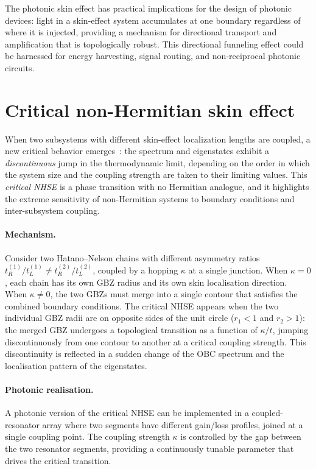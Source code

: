\begin{remark}
The photonic skin effect has practical implications for the design of
photonic devices: light in a skin-effect
system accumulates at one boundary regardless of where it is injected,
providing a mechanism for directional transport and amplification that
is topologically robust. This directional funneling effect could be
harnessed for energy harvesting, signal routing, and non-reciprocal
photonic circuits.
\end{remark}


\section{Critical non-Hermitian skin effect}
\label{sec:critical-skin}

When two subsystems with different skin-effect localization lengths are
coupled, a new critical behavior emerges~\cite{li2020critical}: the
spectrum and eigenstates exhibit a \emph{discontinuous} jump in the
thermodynamic limit, depending on the order in which the system size
and the coupling strength are taken to their limiting values. This
\emph{critical NHSE} is a phase transition with no Hermitian analogue,
and it highlights the extreme sensitivity of non-Hermitian systems to
boundary conditions and inter-subsystem coupling.

\paragraph{Mechanism.}
Consider two Hatano--Nelson chains with different asymmetry ratios
$t_R^{(1)}/t_L^{(1)} \neq t_R^{(2)}/t_L^{(2)}$, coupled by a hopping
$\kappa$ at a single junction. When $\kappa = 0$, each chain has its
own GBZ radius and its own skin localisation direction. When
$\kappa \neq 0$, the two GBZs must merge into a single contour that
satisfies the combined boundary conditions. The critical NHSE appears
when the two individual GBZ radii are on opposite sides of the unit
circle ($r_1 < 1$ and $r_2 > 1$): the merged GBZ undergoes a
topological transition as a function of $\kappa/t$, jumping
discontinuously from one contour to another at a critical coupling
strength. This discontinuity is reflected in a sudden change of the
OBC spectrum and the localisation pattern of the eigenstates.

\paragraph{Photonic realisation.}
A photonic version of the critical NHSE can be implemented in a
coupled-resonator array where two segments have different gain/loss
profiles, joined at a single coupling point. The coupling strength
$\kappa$ is controlled by the gap between the two resonator segments,
providing a continuously tunable parameter that drives the critical
transition.



